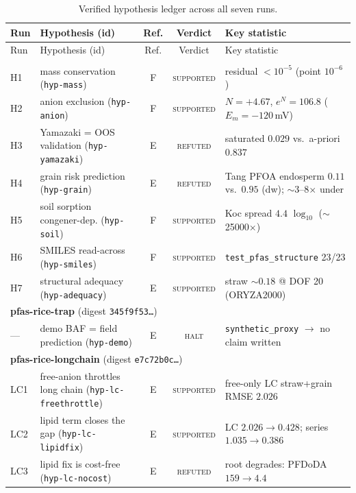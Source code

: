 \documentclass[11pt]{article}
\begin{document}
\begin{longtable}{p{1.6cm} p{3.2cm} c c p{5.2cm}}
\caption{Verified hypothesis ledger across all seven runs.}
\label{tab:ledger}\\
\toprule
Run & Hypothesis (id) & Ref. & Verdict & Key statistic \\
\midrule
\endfirsthead
\toprule
Run & Hypothesis (id) & Ref. & Verdict & Key statistic \\
\midrule
\endhead
\bottomrule
\endfoot
\multicolumn{5}{l}{\textbf{pfas-rice} \quad (digest \texttt{493ec872\ldots})}\\
\midrule
H1 & mass conservation (\texttt{hyp-mass}) & F & \textsc{supported} & residual $<10^{-5}$ (point $10^{-6}$) \\
H2 & anion exclusion (\texttt{hyp-anion}) & F & \textsc{supported} & $N=+4.67$, $e^{N}=106.8$ ($E_m=-120$\,mV) \\
H3 & Yamazaki = OOS validation (\texttt{hyp-yamazaki}) & E & \textsc{refuted} & saturated $0.029$ vs.\ a-priori $0.837$ \\
H4 & grain risk prediction (\texttt{hyp-grain}) & E & \textsc{refuted} & Tang PFOA endosperm $0.11$ vs.\ $0.95$ (dw); $\sim$3--8$\times$ under \\
H5 & soil sorption congener-dep. (\texttt{hyp-soil}) & F & \textsc{supported} & Koc spread $4.4$ $\log_{10}$ ($\sim$25000$\times$) \\
H6 & SMILES read-across (\texttt{hyp-smiles}) & F & \textsc{supported} & \texttt{test\_pfas\_structure} 23/23 \\
H7 & structural adequacy (\texttt{hyp-adequacy}) & E & \textsc{supported} & straw $\sim0.18$ @ DOF 20 (ORYZA2000) \\
\midrule
\multicolumn{5}{l}{\textbf{pfas-rice-trap} \quad (digest \texttt{345f9f53\ldots})}\\
\midrule
--- & demo BAF = field prediction (\texttt{hyp-demo}) & E & \textsc{halt} & \texttt{synthetic\_proxy} $\to$ no claim written \\
\midrule
\multicolumn{5}{l}{\textbf{pfas-rice-longchain} \quad (digest \texttt{e7c72b0c\ldots})}\\
\midrule
LC1 & free-anion throttles long chain (\texttt{hyp-lc-freethrottle}) & E & \textsc{supported} & free-only LC straw+grain RMSE $2.026$ \\
LC2 & lipid term closes the gap (\texttt{hyp-lc-lipidfix}) & E & \textsc{supported} & LC $2.026\!\to\!0.428$; series $1.035\!\to\!0.386$ \\
LC3 & lipid fix is cost-free (\texttt{hyp-lc-nocost}) & E & \textsc{refuted} & root degrades: PFDoDA $159\!\to\!4.4$ \\

\end{longtable}
\end{document}

